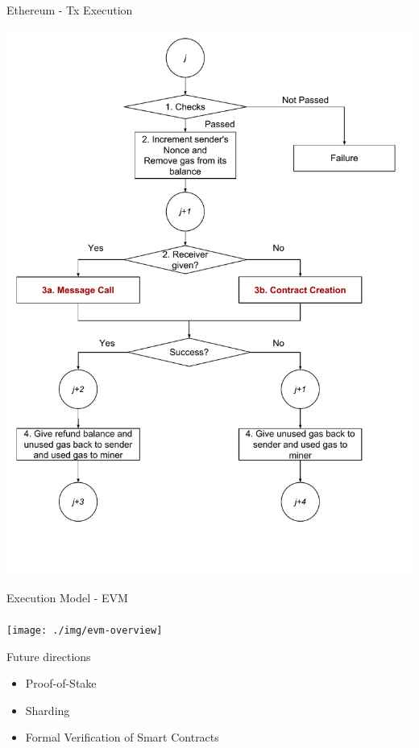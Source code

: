 \begin{frame}{Ethereum - Tx Execution}
    \framesubtitle{\cite{bib:yellow}}
    \begin{center}
        \includegraphics[height=0.95\textheight]{./img/transaction-execution}
    \end{center}
\end{frame}


\begin{frame}{Execution Model - EVM}
    \framesubtitle{\cite{bib:yellow}}
    \begin{center}
        \texttt{[image: ./img/evm-overview]}
    \end{center}
\end{frame}



\begin{frame}{Future directions}
    \begin{itemize}
        \item Proof-of-Stake
        \item Sharding
        \item Formal Verification of Smart Contracts
    \end{itemize}
\end{frame}
